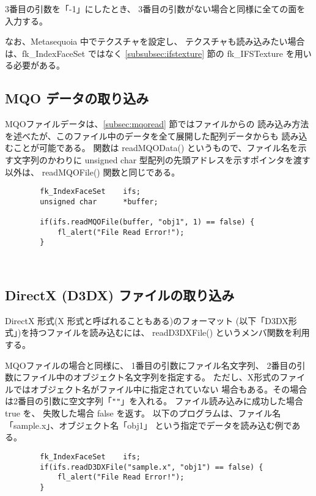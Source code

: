 3番目の引数を「-1」にしたとき、
3番目の引数がない場合と同様に全ての面を入力する。

なお、Metasequoia 中でテクスチャを設定し、
テクスチャも読み込みたい場合は、fk\_IndexFaceSet ではなく
\ref{subsubsec:ifstexture} 節の fk\_IFSTexture を用いる必要がある。

\subsection{MQO データの取り込み} \label{subsec:mqodata}
MQOファイルデータは、\ref{subsec:mqoread} 節ではファイルからの
読み込み方法を述べたが、このファイル中のデータを全て展開した配列データからも
読み込むことが可能である。
関数は readMQOData() というもので、ファイル名を示す文字列のかわりに
unsigned char 型配列の先頭アドレスを示すポインタを渡す以外は、
readMQOFile() 関数と同じである。
\begin{screen}
\begin{verbatim}
        fk_IndexFaceSet    ifs;
        unsigned char      *buffer;

        if(ifs.readMQOFile(buffer, "obj1", 1) == false) {
            fl_alert("File Read Error!");
        }
\end{verbatim}
\end{screen} ~

\subsection{DirectX (D3DX) ファイルの取り込み} \label{subsec:d3dxread}
DirectX 形式(X 形式と呼ばれることもある)のフォーマット
(以下「D3DX形式」)を持つファイルを読み込むには、
readD3DXFile() というメンバ関数を利用する。

MQOファイルの場合と同様に、
1番目の引数にファイル名文字列、
2番目の引数にファイル中のオブジェクト名文字列を指定する。
ただし、X形式のファイルではオブジェクト名がファイル中に指定されていない
場合もある。その場合は2番目の引数に空文字列「\verb+""+」を入れる。
ファイル読み込みに成功した場合 true を、
失敗した場合 false を返す。
以下のプログラムは、ファイル名「sample.x」、オブジェクト名「obj1」
という指定でデータを読み込む例である。
\\
\begin{screen}
\begin{verbatim}
        fk_IndexFaceSet    ifs;
        if(ifs.readD3DXFile("sample.x", "obj1") == false) {
            fl_alert("File Read Error!");
        }
\end{verbatim}
\end{screen} ~

